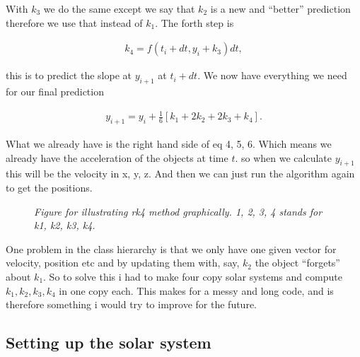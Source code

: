 \documentclass[norsk,a4paper,12pt]{article}
\begin{document}
With $k_3$ we do the same except we say that $k_2$ is a new and ``better'' prediction therefore we use that instead of $k_1$.
The forth step is

\begin{align}
 k_4 = f(t_i + dt, y_i + k_3)dt,
\end{align}

this is to predict the slope at $y_{i+1}$ at $t_i + dt$. We now have everything we need for our final prediction

\begin{align}
 y_{i+1} = y_i + \frac{1}{6} [k_1 + 2k_2 + 2k_3 + k_4].
\end{align}

What we already have is the right hand side of eq 4, 5, 6. Which means we already have the acceleration of the objects at time $t$.
so when we calculate $y_{i+1}$ this will be the velocity in x, y, z. And then we can just run the algorithm again to get the positions.

\begin{figure}[H]
  \begin{center}
  \end{center}
 \caption{\textit{Figure for illustrating rk4 method graphically. 1, 2, 3, 4 stands for k1, k2, k3, k4. }}
  \label{fig:edge}
\end{figure}

One problem in the class hierarchy is that we only have one given vector for velocity, position etc and by updating them with, say, $k_2$
the object ``forgets'' about $k_1$. So to solve this i had to make four copy solar systems and compute $k_1, k_2, k_3, k_4$ in 
one copy each. This makes for a messy and long code, and is therefore something i would try to improve for the future.

\subsection*{Setting up the solar system}
\end{document}
